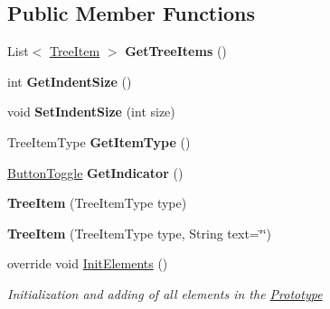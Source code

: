 \subsection*{Public Member Functions}
\begin{DoxyCompactItemize}
\item 
\mbox{\label{class_space_v_i_l_1_1_tree_item_a04cc3cff3b60fc185b652f04175d59bf}} 
List$<$ \mbox{\hyperlink{class_space_v_i_l_1_1_tree_item}{Tree\+Item}} $>$ {\bfseries Get\+Tree\+Items} ()
\item 
\mbox{\label{class_space_v_i_l_1_1_tree_item_a914d914d7f8a796875eb700dfe89e971}} 
int {\bfseries Get\+Indent\+Size} ()
\item 
\mbox{\label{class_space_v_i_l_1_1_tree_item_a7c3087d3b489be9dc0987a2f471cd5d4}} 
void {\bfseries Set\+Indent\+Size} (int size)
\item 
\mbox{\label{class_space_v_i_l_1_1_tree_item_a0e03223eba47c946a2e99b9b9e0f0002}} 
Tree\+Item\+Type {\bfseries Get\+Item\+Type} ()
\item 
\mbox{\label{class_space_v_i_l_1_1_tree_item_af82cc9b8bdc775c53fc3eaf9d9f6a920}} 
\mbox{\hyperlink{class_space_v_i_l_1_1_button_toggle}{Button\+Toggle}} {\bfseries Get\+Indicator} ()
\item 
\mbox{\label{class_space_v_i_l_1_1_tree_item_a59309d2dd1b95c9bece99fe921765313}} 
{\bfseries Tree\+Item} (Tree\+Item\+Type type)
\item 
\mbox{\label{class_space_v_i_l_1_1_tree_item_a8fc711463af22531c6727df6b840f1e6}} 
{\bfseries Tree\+Item} (Tree\+Item\+Type type, String text=\char`\"{}\char`\"{})
\item 
override void \mbox{\hyperlink{class_space_v_i_l_1_1_tree_item_a4f40a1de34aa41b1eff340f98de81756}{Init\+Elements}} ()
\begin{DoxyCompactList}\small\item\em Initialization and adding of all elements in the \mbox{\hyperlink{class_space_v_i_l_1_1_prototype}{Prototype}} \end{DoxyCompactList}\item 

\end{DoxyCompactItemize}
